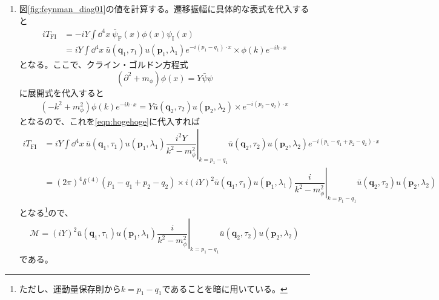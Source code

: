 \documentclass[unicode,a4paper,10pt]{ltjsarticle}
\begin{document}
\begin{enumerate}
  \item
        図\ref{fig:feynman_diag01}の値を計算する。遷移振幅に具体的な表式を代入すると
        \begin{align}
          iT_{\textrm{FI}}
           & =
          -iY
          \int\dd^4 x\
          \bar{\psi}_{\textrm{F}}(x)\phi(x)\psi_{\textrm{I}}(x)
          \nonumber
          \\
           & =
          iY
          \int\dd^4 x\
          \bar{u}(\bm{q}_{1},\tau_{1})u(\bm{p}_{1},\lambda_{1})e^{-i(p_{1}-q_{1})\cdot x}
          \times
          \phi(k)e^{-ik\cdot x}
          \label{eqn:hogehoge}
        \end{align}
        となる。ここで、クライン・ゴルドン方程式
        \begin{equation}
          (\partial^2+m_{\phi})\phi(x)
          =
          Y\bar{\psi}\psi
        \end{equation}
        に展開式を代入すると
        \begin{gather}
          (-k^2+m_{\phi}^2)\phi(k)e^{-ik\cdot x}
          =
          Y\bar{u}(\bm{q}_{2},\tau_{2})u(\bm{p}_{2},\lambda_{2})
          \times
          e^{-i(p_{2}-q_{2})\cdot x}
        \end{gather}
        となるので、これを\eqref{eqn:hogehoge}に代入すれば
        \begin{align}
          iT_{\textrm{FI}}
           & =
          iY
          \int\dd^4 x\
          \bar{u}(\bm{q}_{1},\tau_{1})u(\bm{p}_{1},\lambda_{1})
          \left.\dfrac{i^2 Y}{k^2-m_{\phi}^2}\right|_{k=p_{1}-q_{1}}
          \bar{u}(\bm{q}_{2},\tau_{2})u(\bm{p}_{2},\lambda_{2})
          e^{-i(p_{1}-q_{1}+p_{2}-q_{2})\cdot x}
          \nonumber
          \\
           & =
          (2\pi)^4\delta^{(4)}(p_{1}-q_{1}+p_{2}-q_{2})
          \times
          i(iY)^2
          \bar{u}(\bm{q}_{1},\tau_{1})u(\bm{p}_{1},\lambda_{1})
          \left.\dfrac{i}{k^2-m_{\phi}^2}\right|_{k=p_{1}-q_{1}}
          \bar{u}(\bm{q}_{2},\tau_{2})u(\bm{p}_{2},\lambda_{2})
        \end{align}
        となる\footnote{
        ただし、運動量保存則から$k=p_{1}-q_{1}$であることを暗に用いている。
        }ので、
        \begin{equation}
          \mathcal{M}
          =
          (iY)^2
          \bar{u}(\bm{q}_{1},\tau_{1})u(\bm{p}_{1},\lambda_{1})
          \left.\dfrac{i}{k^2-m_{\phi}^2}\right|_{k=p_{1}-q_{1}}
          \bar{u}(\bm{q}_{2},\tau_{2})u(\bm{p}_{2},\lambda_{2})
        \end{equation}
        である。


\end{enumerate}
\end{document}

